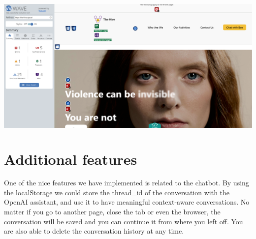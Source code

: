 \vspace{1em}

\begin{center}
    \includegraphics[width=0.75\linewidth]{img/wave-result.png}
\end{center}


\section{Additional features}
One of the nice features we have implemented is related to the chatbot.
By using the localStorage we could store the thread\_id of the conversation with the OpenAI assistant, and use it to have meaningful context-aware conversations.
No matter if you go to another page, close the tab or even the browser, the conversation will be saved and you can continue it from where you left off.
You are also able to delete the conversation history at any time.
